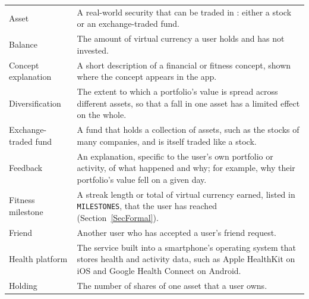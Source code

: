 \documentclass[12pt]{article}
\begin{document}
\begin{longtable}{>{\raggedright\arraybackslash}p{} p{}}
  Asset                                              & A real-world security that can be traded in \progname{}: either a stock or an exchange-traded fund.                                                                     \\
  Balance                                            & The amount of virtual currency a user holds and has not invested.                                                                                                       \\
  Concept explanation                                & A short description of a financial or fitness concept, shown where the concept appears in the app.                                                                      \\
  Diversification                                    & The extent to which a portfolio's value is spread across different assets, so that a fall in one asset has a limited effect on the whole.                               \\
  Exchange-traded fund\label{def:etf} & A fund that holds a collection of assets, such as the stocks of many companies, and is itself traded like a stock.                                                      \\
  Feedback                                           & An explanation, specific to the user's own portfolio or activity, of what happened and why; for example, why their portfolio's value fell on a given day.               \\
  Fitness milestone                                  & A streak length or total of virtual currency earned, listed in \texttt{MILESTONES}, that the user has reached (Section~\ref{SecFormal}).                                  \\
  Friend                                             & Another \progname{} user who has accepted a user's friend request.                                                                                                      \\
  Health platform                                    & The service built into a smartphone's operating system that stores health and activity data, such as Apple HealthKit on iOS and Google Health Connect on Android.       \\
  Holding                                            & The number of shares of one asset that a user owns.                                                                                                                     \\

\end{longtable}
\end{document}
